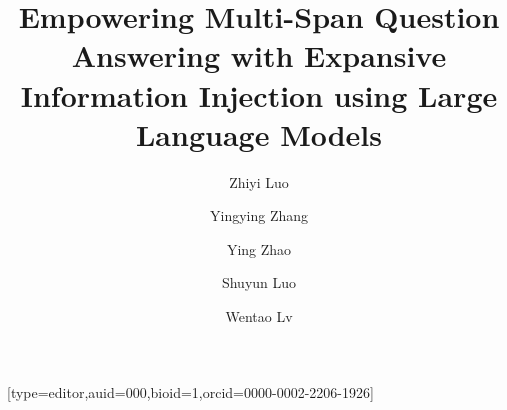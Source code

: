 \documentclass[a4paper,fleqn,twocolumn]{cas-dc}
\newcommand{\1}[1]{\mathds{1}\left[#1\right]}
\begin{document}
\let\WriteBookmarks\relax
\def\floatpagepagefraction{1}
\def\textpagefraction{.001}



\title{Empowering Multi-Span Question Answering with Expansive Information Injection using Large Language Models}  

\author{Zhiyi Luo}[type=editor,auid=000,bioid=1,orcid=0000-0002-2206-1926]

\author{Yingying Zhang}

\author{Ying Zhao}

\author{Shuyun Luo}
\cormark[1]
\cormark[1]

\author{Wentao Lv}

\address[mymainaddress]{School of Computer Science and Technology and the Key Laboratory of Intelligent Textile and Flexible Interconnection of Zhejiang Province, Zhejiang Sci-Tech University}
\address[mysecondaryaddress]{No. 928, No. 2 street, Baiyang street, Qiantang New District, Hangzhou 310018, China}


%
%
%
%
%
%
%
%
%
\end{document}
